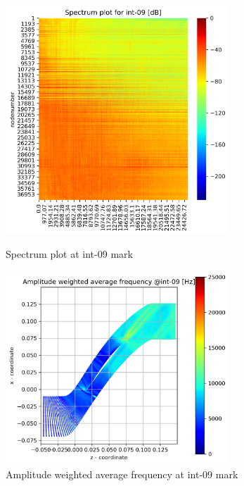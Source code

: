 \begin{figure}[ht]
  \centering
  \includegraphics[width=0.75\textwidth]{Figures/int-09_spectrum.png}
  \caption{Spectrum plot at int-09 mark} \label{int-09-spectrum}
  
  \vspace*{\floatsep}%

  \includegraphics[width=0.75\textwidth]{Figures/int-09-awaf.png}
  \caption{Amplitude weighted average frequency at int-09 mark} \label{int-09-awaf}
\end{figure}
